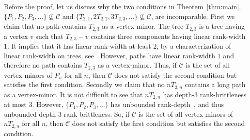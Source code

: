\documentclass[11pt]{article}
\begin{document}
        Before the proof, let us discuss why
        the two conditions in Theorem~\ref{thm:main}, 
      $\{P_1, P_2, P_3, \ldots \}\not\subseteq \mathcal C$		and
      $\{T_{2,1}, 2T_{2,2}, 3T_{2,3}, \ldots \}\not\subseteq \mathcal C$, are incomparable.
      First we claim that no path contains $T_{2,3}$ as a vertex-minor.
      The tree $T_{2,3}$ is a tree having a vertex $v$ such that $T_{2,3}-v$ contains three components having linear rank-width $1$. It implies that it has linear rank-width at least $2$,
      by a characterization of linear rank-width on trees, see \cite{AdlerK2015, AdlerKK2017}.
      However, paths have linear rank-width $1$ and therefore
      no path contains $T_{2,3}$ as a vertex-minor.
      Thus, if $\mathcal C$ is the set of all vertex-minors of $P_n$ for all $n$, then $\mathcal C$ does not satisfy the second condition but satisfies the first condition.
      Secondly we claim that no $nT_{2,n}$ contains a long path as a vertex-minor.
      It is not difficult to see that $nT_{2,n}$ has depth-$3$ rank-brittleness at most $3$. 
%
%
%
%
%
      However, $\{P_1, P_2, P_3, \ldots \}$ has unbounded rank-depth~\cite{DKO2019}, and thus unbounded depth-$3$ rank-brittleness.
      So, if $\mathcal C$ is the set of all vertex-minors of $nT_{2,n}$ for all $n$,
      then $\mathcal C$ does not satisfy the first condition but satisfies the second condition.
\end{document}
